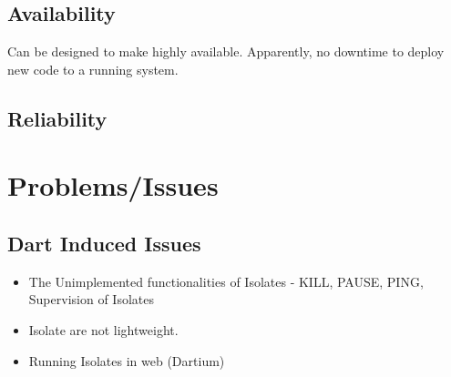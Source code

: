 \subsection{Availability}
    Can be designed to make highly available. Apparently, no downtime to deploy new code to a running system.

  \subsection{Reliability}


\section{Problems/Issues}
\subsection{Dart Induced Issues}
  \begin{itemize}
  \item The Unimplemented functionalities of Isolates
    - KILL, PAUSE, PING, Supervision of Isolates
  \item Isolate are not lightweight.
  \item Running Isolates in web (Dartium)
\end{itemize}
